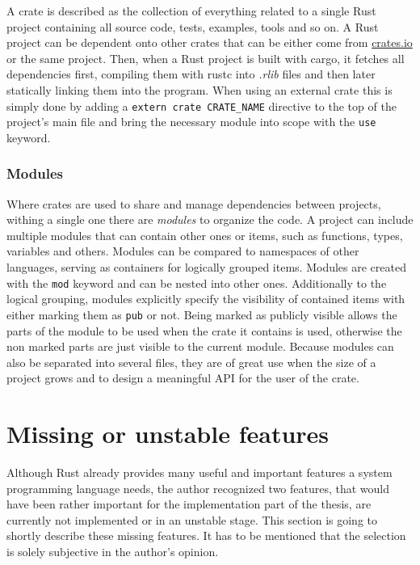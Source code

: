 A crate is described as the collection of everything related to a single Rust project containing all source code, tests, examples, tools and so on. A Rust project can be dependent onto other crates that can be either come from \url{crates.io} or the same project. Then, when a Rust project is built with cargo, it fetches all dependencies first, compiling them with rustc into \textit{.rlib} files and then later statically linking them into the program. When using an external crate this is simply done by adding a \texttt{extern crate CRATE\_NAME} directive to the top of the project's main file and bring the necessary module into scope with the \texttt{use} keyword.

\subsubsection{Modules}

Where crates are used to share and manage dependencies between projects, withing a single one there are \textit{modules} to organize the code. A project can include multiple modules that can contain other ones or items, such as functions, types, variables and others. Modules can be compared to namespaces of other languages, serving as containers for logically grouped items. Modules are created with the \texttt{mod} keyword and can be nested into other ones. Additionally to the logical grouping, modules explicitly specify the visibility of contained items with either marking them as \texttt{pub} or not. Being marked as publicly visible allows the parts of the module to be used when the crate it contains is used, otherwise the non marked parts are just visible to the current module. Because modules can also be separated into several files, they are of great use when the size of a project grows and to design a meaningful \ac{API} for the user of the crate.

\section{Missing or unstable features}

Although Rust already provides many useful and important features a system programming language needs, the author recognized two features, that would have been rather important for the implementation part of the thesis, are currently not implemented or in an unstable stage. This section is going to shortly describe these missing features. It has to be mentioned that the selection is solely subjective in the author's opinion.

